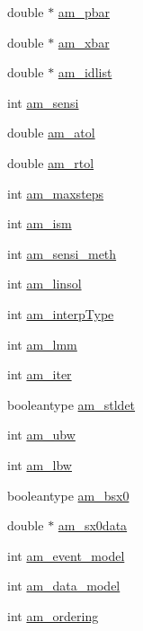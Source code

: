 \begin{DoxyCompactItemize}
\item 
double $\ast$ \hyperlink{struct_user_data_aa73d75cc02e28bcdf108cbea53e615e9}{am\+\_\+pbar}
\item 
double $\ast$ \hyperlink{struct_user_data_ad21f2b82715b051daf2775ed059afdbb}{am\+\_\+xbar}
\item 
double $\ast$ \hyperlink{struct_user_data_ab62bd78b1593ddbf3d854356b4dcaa0f}{am\+\_\+idlist}
\item 
int \hyperlink{struct_user_data_a3bd631d595b8a864de83f25a1756ce3d}{am\+\_\+sensi}
\item 
double \hyperlink{struct_user_data_a2aade90998d7e2cefa7953d4fdbc438b}{am\+\_\+atol}
\item 
double \hyperlink{struct_user_data_a2370b78f280747d84a69619ea8c55985}{am\+\_\+rtol}
\item 
int \hyperlink{struct_user_data_a0187950731c16f2857d0cd5b92416352}{am\+\_\+maxsteps}
\item 
int \hyperlink{struct_user_data_a1f2514c0ee00da61ade386173b718a02}{am\+\_\+ism}
\item 
int \hyperlink{struct_user_data_a83bc6716ecf3decb3d963929361fcd6d}{am\+\_\+sensi\+\_\+meth}
\item 
int \hyperlink{struct_user_data_a03fa52449ab4bb9a1a75312fd9064db1}{am\+\_\+linsol}
\item 
int \hyperlink{struct_user_data_a02adc800558b1cdac3fa8bc96e65dbbb}{am\+\_\+interp\+Type}
\item 
int \hyperlink{struct_user_data_a18b6fbc6159783acab9b5f4b106077cd}{am\+\_\+lmm}
\item 
int \hyperlink{struct_user_data_a2e0183eade68209e6835d3199054f0cc}{am\+\_\+iter}
\item 
booleantype \hyperlink{struct_user_data_a7d39c238c319f0164a15744950bfd021}{am\+\_\+stldet}
\item 
int \hyperlink{struct_user_data_a7283826ef630f92bb04052eb79a377e5}{am\+\_\+ubw}
\item 
int \hyperlink{struct_user_data_a0fd271dea83e804c7b1ef82a2b0ab76c}{am\+\_\+lbw}
\item 
booleantype \hyperlink{struct_user_data_a87d2f917b1bea7fea2d5878ccd43c7db}{am\+\_\+bsx0}
\item 
double $\ast$ \hyperlink{struct_user_data_a7ac27602345668b3a2bcabac4c7af733}{am\+\_\+sx0data}
\item 
int \hyperlink{struct_user_data_ace3cae0f78a3365a5fac7d7daa9928ff}{am\+\_\+event\+\_\+model}
\item 
int \hyperlink{struct_user_data_a83373144a2adb9f97cdfca2dfc79ce80}{am\+\_\+data\+\_\+model}
\item 
int \hyperlink{struct_user_data_a260a14e35469f1516b194f4f065a9794}{am\+\_\+ordering}
\end{DoxyCompactItemize}



